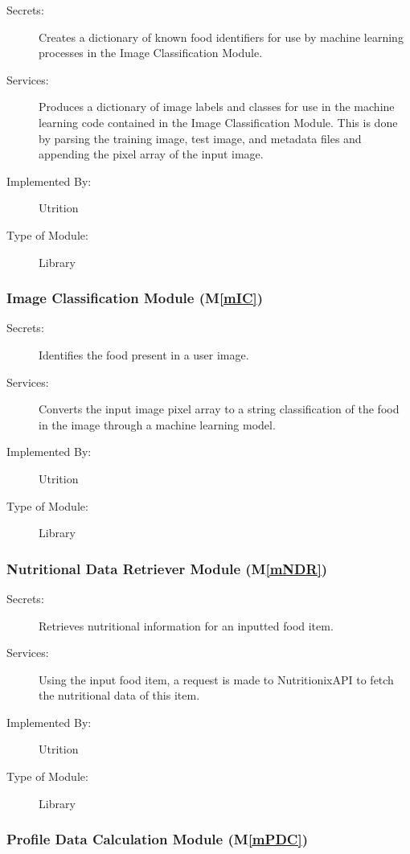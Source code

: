 \documentclass[12pt, titlepage]{article}
\newcommand{\mref}[1]{M\ref{#1}}
\begin{document}
\begin{description}
	\item[Secrets:] Creates a dictionary of known food identifiers for use by machine learning processes in the Image Classification Module.
	\item[Services:] Produces a dictionary of image labels and classes for use in the machine learning code contained in the Image Classification Module. This is done by parsing the training image, test image, and metadata files and appending the pixel array of the input image.
	\item[Implemented By:] Utrition
	\item[Type of Module:] Library
\end{description}

\subsubsection{Image Classification Module (\mref{mIC})}

\begin{description}
\item[Secrets:] Identifies the food present in a user image.
\item[Services:]Converts the input image pixel array to a string classification 
of the food in the image through a machine 
learning model.
\item[Implemented By:] Utrition
\item[Type of Module:] Library
\end{description}

\subsubsection{Nutritional Data Retriever Module (\mref{mNDR})}

\begin{description}
	\item[Secrets:]Retrieves nutritional information for an inputted food item.
	\item[Services:]Using the input food item, a request is made to NutritionixAPI to fetch the nutritional data of this item.
	\item[Implemented By:] Utrition
	\item[Type of Module:] Library
\end{description}

\subsubsection{Profile Data Calculation Module (\mref{mPDC})}
\end{document}
